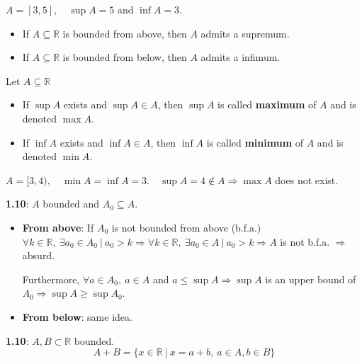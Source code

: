 \documentclass[12pt, a4paper]{book}
\begin{document}
\begin{exmp}
  $A = [3,5],\quad \sup A = 5$ and $\inf A = 3$.
\end{exmp}

\begin{proposition}
  \begin{itemize}
    \item If $A \subseteq \mathbb{R}$ is bounded from above, then $A$ admits a supremum.
    \item If $A \subseteq \mathbb{R}$ is bounded from below, then $A$ admits a infimum.
  \end{itemize}
\end{proposition}

\begin{defn}
  Let $A \subseteq \mathbb{R}$
  \begin{itemize}
    \item If $\sup A$ exists and $\sup A \in A$, then $\sup A$ is called \textbf{maximum} of $A$ and is denoted $\max A$.
    \item If $\inf A$ exists and $\inf A \in A$, then $\inf A$ is called \textbf{minimum} of $A$ and is denoted $\min A$.
  \end{itemize}
\end{defn}

\begin{exmp}
  $A = [3,4),\quad \min A = \inf A = 3. \quad \sup A = 4 \notin A \Rightarrow \max A$ does not exist.
\end{exmp}

\textbf{1.10}: $A$ bounded and $A_0 \subseteq A$.
\begin{itemize}
  \item \textbf{From above}: If $A_0$ is not bounded from above (b.f.a.) $\forall k\in\mathbb{R},\ \exists a_0 \in A_0\ |\ a_0 >k \Rightarrow \forall k\in\mathbb{R},\ \exists a_0 \in A\ |\ a_0>k \Rightarrow A$ is not b.f.a. $\Rightarrow$ absurd.

  Furthermore, $\forall a\in A_0,\ a\in A$ and $a\leq \sup A \Rightarrow \sup A$ is an upper bound of $A_0 \Rightarrow \sup A \geq \sup A_0$.
  \item \textbf{From below}: same idea.
\end{itemize}

\textbf{1.10}: $A,B\subset \mathbb{R}$ bounded.
\[
  A+B = \{x\in\mathbb{R}\ |\ x=a+b,\ a\in A,b\in B\}
\]
\end{document}
